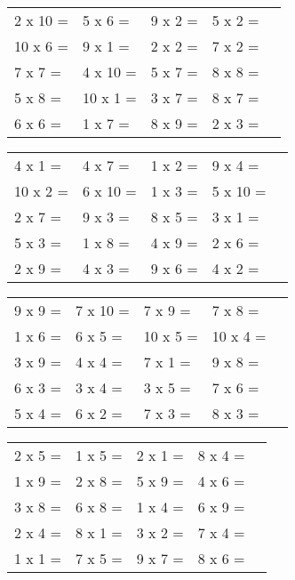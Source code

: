 \documentclass{article}
\begin{document}
\begin{table}[ht] 
\begin{tabular}{ M{3cm} M{3.5cm} M{3,5cm} M{3.5cm} N }
2 x 10 =    & 5 x 6 =   & 9 x 2 =    &   5 x 2 =        &\\[1em] 
10 x 6 =    & 9 x 1 =   & 2 x 2 =    &   7 x 2 =        &\\[1em] 
7 x 7 =    & 4 x 10 =   & 5 x 7 =    &   8 x 8 =        &\\[1em] 
5 x 8 =    & 10 x 1 =   & 3 x 7 =    &   8 x 7 =        &\\[1em] 
6 x 6 =    & 1 x 7 =   & 8 x 9 =    &   2 x 3 =        &\\[1em] 
\end{tabular}\end{table} 

\begin{table}[ht] 
\begin{tabular}{ M{3cm} M{3.5cm} M{3,5cm} M{3.5cm} N }
4 x 1 =    & 4 x 7 =   & 1 x 2 =    &   9 x 4 =        &\\[1em] 
10 x 2 =    & 6 x 10 =   & 1 x 3 =    &   5 x 10 =        &\\[1em] 
2 x 7 =    & 9 x 3 =   & 8 x 5 =    &   3 x 1 =        &\\[1em] 
5 x 3 =    & 1 x 8 =   & 4 x 9 =    &   2 x 6 =        &\\[1em] 
2 x 9 =    & 4 x 3 =   & 9 x 6 =    &   4 x 2 =        &\\[1em] 
\end{tabular}\end{table} 

\begin{table}[ht] 
\begin{tabular}{ M{3cm} M{3.5cm} M{3,5cm} M{3.5cm} N }
9 x 9 =    & 7 x 10 =   & 7 x 9 =    &   7 x 8 =        &\\[1em] 
1 x 6 =    & 6 x 5 =   & 10 x 5 =    &   10 x 4 =        &\\[1em] 
3 x 9 =    & 4 x 4 =   & 7 x 1 =    &   9 x 8 =        &\\[1em] 
6 x 3 =    & 3 x 4 =   & 3 x 5 =    &   7 x 6 =        &\\[1em] 
5 x 4 =    & 6 x 2 =   & 7 x 3 =    &   8 x 3 =        &
\end{tabular}\end{table} 

\begin{table}[ht] 
\begin{tabular}{ M{3cm} M{3.5cm} M{3,5cm} M{3.5cm} N }
2 x 5 =    & 1 x 5 =   & 2 x 1 =    &   8 x 4 =        &\\[1em] 
1 x 9 =    & 2 x 8 =   & 5 x 9 =    &   4 x 6 =        &\\[1em] 
3 x 8 =    & 6 x 8 =   & 1 x 4 =    &   6 x 9 =        &\\[1em] 
2 x 4 =    & 8 x 1 =   & 3 x 2 =    &   7 x 4 =        &\\[1em] 
1 x 1 =    & 7 x 5 =   & 9 x 7 =    &   8 x 6 =        &
\end{tabular}\end{table} 
\end{document}
